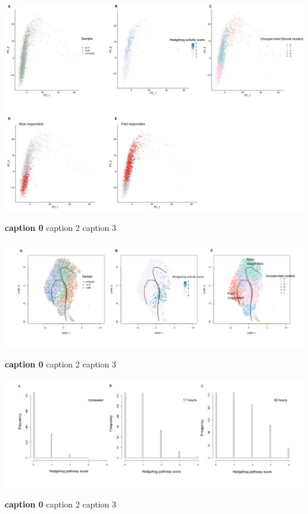 \begin{suppfigure}[p]  
    \centering
    \includegraphics[width=\linewidth]{figures/hedgehog/SuppFigure5.png}
    \caption[caption1]{
        \textbf{caption 0}
        caption 2
        caption 3   
    }
    \label{fig:hh_figureS5}
\end{suppfigure}

\begin{suppfigure}[p]  
    \centering
    \includegraphics[width=\linewidth]{figures/hedgehog/SuppFigure6.png}
    \caption[caption1]{
        \textbf{caption 0}
        caption 2
        caption 3   
    }
    \label{fig:hh_figureS6}
\end{suppfigure}

\begin{suppfigure}[p]  
    \centering
    \includegraphics[width=\linewidth]{figures/hedgehog/SuppFigure7.png}
    \caption[caption1]{
        \textbf{caption 0}
        caption 2
        caption 3   
    }
    \label{fig:hh_figureS7}
\end{suppfigure}


